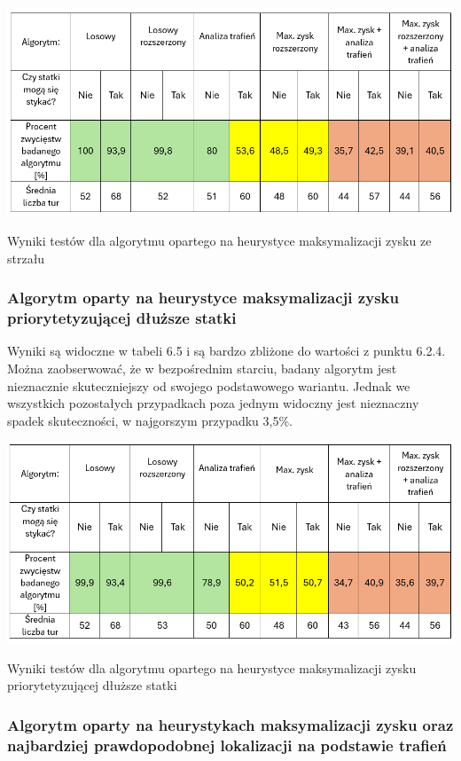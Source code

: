 \begin{table}[!h]
    \centering
    \includegraphics[width=1\linewidth]{img/table-location-heuristic.png}
    \caption{Wyniki testów dla algorytmu opartego na heurystyce maksymalizacji zysku ze strzału}
\end{table}


\subsubsection{Algorytm oparty na heurystyce maksymalizacji zysku priorytetyzującej dłuższe statki}

Wyniki są widoczne w tabeli 6.5 i są bardzo zbliżone do wartości z punktu 6.2.4. Można zaobserwować, że w bezpośrednim starciu, badany algorytm jest nieznacznie skuteczniejszy od swojego podstawowego wariantu. Jednak we wszystkich pozostałych przypadkach poza jednym widoczny jest nieznaczny spadek skuteczności, w najgorszym przypadku 3,5\%.

\begin{table}[!h]
    \centering
    \includegraphics[width=1\linewidth]{img/table-location-heuristic-extended.png}
    \caption{Wyniki testów dla algorytmu opartego na heurystyce maksymalizacji zysku priorytetyzującej dłuższe statki}
\end{table}

\subsubsection{Algorytm oparty na heurystykach maksymalizacji zysku oraz najbardziej prawdopodobnej lokalizacji na podstawie trafień}

